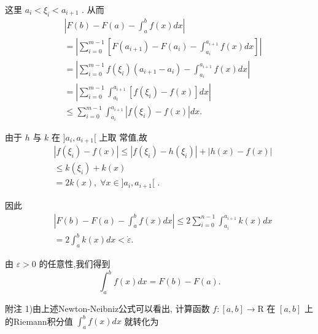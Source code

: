 这里 ${a}_{i} < {\xi }_{i} < {a}_{i + 1}$ . 从而
\begin{align*}
	&\left| {F\left( b\right)  - F\left( a\right)  - {\int }_{a}^{b}f\left( x\right) {dx}}\right|\\
	&= \left| {\mathop{\sum }\limits_{{i = 0}}^{{m - 1}}\left\lbrack  {F\left( {a}_{i + 1}\right)  - F\left( {a}_{i}\right)  - {\int }_{{a}_{i}}^{{a}_{i + 1}}f\left( x\right) {dx}}\right\rbrack  }\right|\\
	&= \left| {\mathop{\sum }\limits_{{i = 0}}^{{m - 1}}f\left( {\xi }_{i}\right) \left( {{a}_{i + 1} - {a}_{i}}\right)  - {\int }_{{a}_{i}}^{{a}_{i + 1}}f\left( x\right) {dx}}\right|\\
	&= \left| {\mathop{\sum }\limits_{{i = 0}}^{{m - 1}}{\int }_{{a}_{i}}^{{a}_{i + 1}}\left\lbrack  {f\left( {\xi }_{i}\right)  - f\left( x\right) }\right\rbrack  {dx}}\right|\\
	&\leq  \mathop{\sum }\limits_{{i = 0}}^{{m - 1}}{\int }_{{a}_{i}}^{{a}_{i + 1}}\left| {f\left( {\xi }_{i}\right)  - f\left( x\right) }\right| {dx}.
\end{align*}

由于 $h$ 与 $k$ 在 $\rbrack {a}_{i},{a}_{i + 1}\lbrack$ 上取 常值,故
\begin{align*}
	&\left| {f\left( {\xi }_{i}\right)  - f\left( x\right) }\right|  \leq  \left| {f\left( {\xi }_{i}\right)  - h\left( {\xi }_{i}\right) }\right|  + \left| {h\left( x\right)  - f\left( x\right) }\right|\\
	&\leq  k\left( {\xi }_{i}\right)  + k\left( x\right)\\
	&= {2k}\left( x\right) ,\;\forall x \in  \rbrack {a}_{i},{a}_{i + 1}\lbrack \text{ . }
\end{align*}

因此
\begin{align*}
	&\left| {F\left( b\right)  - F\left( a\right)  - {\int }_{a}^{b}f\left( x\right) {dx}}\right|  \leq  2\mathop{\sum }\limits_{{i = 0}}^{{n - 1}}{\int }_{{a}_{i}}^{{a}_{i + 1}}k\left( x\right) {dx}\\
	&= 2{\int }_{a}^{b}k\left( x\right) {dx} < \dot{\varepsilon }.
\end{align*}

由 $\varepsilon  > 0$ 的任意性,我们得到
$${\int }_{a}^{b}f\left( x\right) {dx} = F\left( b\right)  - F\left( a\right) .$$

附注 1)由上述Newton-Neibniz公式可以看出, 计算函数 $f : \left\lbrack  {a,b}\right\rbrack   \rightarrow  \mathrm{R}$ 在 $\left\lbrack  {a,b}\right\rbrack$ 上的Riemann积分值 ${\int }_{a}^{b}f\left( x\right) {dx}$ 就转化为

